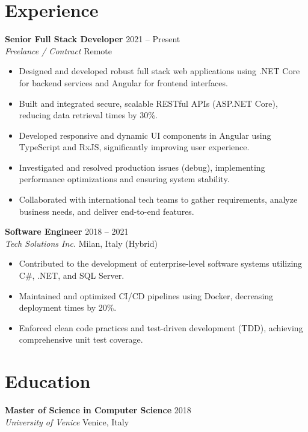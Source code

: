 \documentclass[11pt,a4paper]{article}
\begin{document}
\section*{Experience}
\noindent
\textbf{Senior Full Stack Developer} \hfill 2021 -- Present \\
\textit{Freelance / Contract} \hfill Remote
\begin{itemize}[leftmargin=*]
    \item Designed and developed robust full stack web applications using .NET Core for backend services and Angular for frontend interfaces.
    \item Built and integrated secure, scalable RESTful APIs (ASP.NET Core), reducing data retrieval times by 30\%.
    \item Developed responsive and dynamic UI components in Angular using TypeScript and RxJS, significantly improving user experience.
    \item Investigated and resolved production issues (debug), implementing performance optimizations and ensuring system stability.
    \item Collaborated with international tech teams to gather requirements, analyze business needs, and deliver end-to-end features.
\end{itemize}

\vspace{2mm}
\noindent
\textbf{Software Engineer} \hfill 2018 -- 2021 \\
\textit{Tech Solutions Inc.} \hfill Milan, Italy (Hybrid)
\begin{itemize}[leftmargin=*]
    \item Contributed to the development of enterprise-level software systems utilizing C\#, .NET, and SQL Server.
    \item Maintained and optimized CI/CD pipelines using Docker, decreasing deployment times by 20\%.
    \item Enforced clean code practices and test-driven development (TDD), achieving comprehensive unit test coverage.
\end{itemize}

\section*{Education}
\noindent
\textbf{Master of Science in Computer Science} \hfill 2018 \\
\textit{University of Venice} \hfill Venice, Italy
\end{document}
